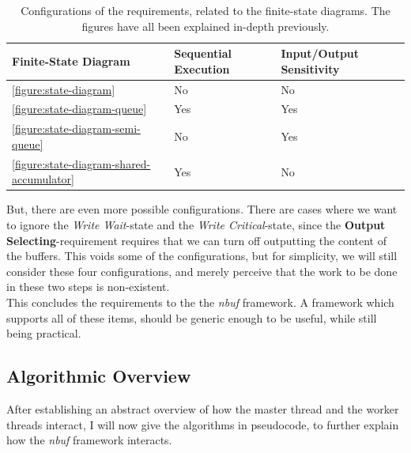 \documentclass[a4paper]{article}
\newcommand{\nbuf}{\textit{nbuf} }
\begin{document}
\begin{table}[]
\begin{adjustwidth}{-0.5in}{-0.5in}
\centering
\begin{tabular}{@{}lll@{}}
\toprule
\textbf{Finite-State Diagram}                     & \textbf{Sequential Execution} & \textbf{Input/Output Sensitivity} \\ \midrule
\autoref{figure:state-diagram}                    & No                            & No                                \\ \midrule
\autoref{figure:state-diagram-queue}              & Yes                           & Yes                               \\ \midrule
\autoref{figure:state-diagram-semi-queue}         & No                            & Yes                               \\ \midrule
\autoref{figure:state-diagram-shared-accumulator} & Yes                           & No                                \\ \bottomrule
\end{tabular}
\caption{Configurations of the requirements, related to the finite-state diagrams. The figures have all been explained in-depth previously.}
\label{table:state-relation}
\end{adjustwidth}
\end{table}


But, there are even more possible configurations. There are cases where we want to ignore the \textit{Write Wait}-state and the \textit{Write Critical}-state, since the \textbf{Output Selecting}-requirement requires that we can turn off outputting the content of the buffers. This voids some of the configurations, but for simplicity, we will still consider these four configurations, and merely perceive that the work to be done in these two steps is non-existent.\\

This concludes the requirements to the the \nbuf framework. A framework which supports all of these items, should be generic enough to be useful, while still being practical.


\subsection{Algorithmic Overview}
After establishing an abstract overview of how the master thread and the worker threads interact, I will now give the algorithms in pseudocode, to further explain how the \nbuf framework interacts.\\
\end{document}
